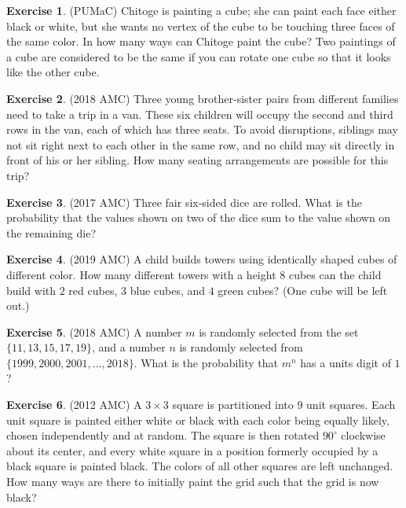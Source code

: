 \documentclass[l1pt]{article}
\theoremstyle{plain}
\theoremstyle{definition}
\newtheorem{exercise}{Exercise}[section]
\theoremstyle{remark}
\begin{document}
\begin{exercise}
(PUMaC) Chitoge is painting a cube; she can paint each face either black or white, but she wants no vertex of the cube to be touching three faces of the same color. In how many ways can Chitoge paint the cube? Two paintings of a cube are considered to be the same if you can rotate one cube so that it looks like the other cube.
\end{exercise}

\begin{exercise}
(2018 AMC) Three young brother-sister pairs from different families need to take a trip in a van. These six children will occupy the second and third rows in the van, each of which has three seats. To avoid disruptions, siblings may not sit right next to each other in the same row, and no child may sit directly in front of his or her sibling. How many seating arrangements are possible for this trip?
\end{exercise}

\begin{exercise}
(2017 AMC) Three fair six-sided dice are rolled. What is the probability that the values shown on two of the dice sum to the value shown on the remaining die?
\end{exercise}

\begin{exercise}
(2019 AMC) A child builds towers using identically shaped cubes of different color. How many different towers with a height $8$ cubes can the child build with $2$ red cubes, $3$ blue cubes, and $4$ green cubes? (One cube will be left out.)
\end{exercise}

\begin{exercise}
(2018 AMC) A number $m$ is randomly selected from the set $\{11,13,15,17,19\}$, and a number $n$ is randomly selected from $\{1999,2000,2001, \dots,2018\}$. What is the probability that $m^n$ has a units digit of $1$?
\end{exercise}

\begin{exercise}
(2012 AMC) A $3\times3$ square is partitioned into $9$ unit squares. Each unit square is painted either white or black with each color being equally likely, chosen independently and at random. The square is then rotated $90^\circ$ clockwise about its center, and every white square in a position formerly occupied by a black square is painted black. The colors of all other squares are left unchanged. How many ways are there to initially paint the grid such that the grid is now black?
\end{exercise}
\end{document}
